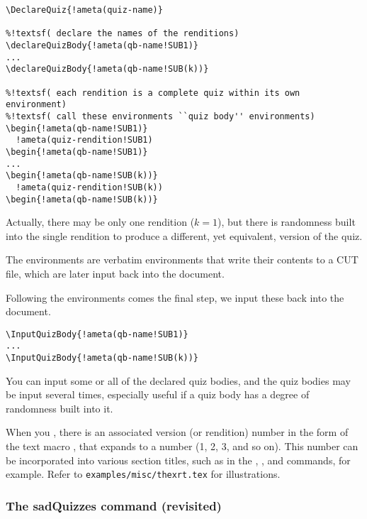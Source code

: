 \documentclass{article}
\let\tops\texorpdfstring
\def\FmtMP#1{\marginpar{\small\itshape\raggedleft#1}}
\edef\amtIndent{\the\parindent}
\begin{document}
\begin{Verbatim}[xleftmargin=\amtIndent,commandchars=!()]
%!textsf( declare the name of this quiz)
\DeclareQuiz{!ameta(quiz-name)}

%!textsf( declare the names of the renditions)
\declareQuizBody{!ameta(qb-name!SUB1)}
...
\declareQuizBody{!ameta(qb-name!SUB(k))}

%!textsf( each rendition is a complete quiz within its own environment)
%!textsf( call these environments ``quiz body'' environments)
\begin{!ameta(qb-name!SUB1)}
  !ameta(quiz-rendition!SUB1)
\begin{!ameta(qb-name!SUB1)}
...
\begin{!ameta(qb-name!SUB(k))}
  !ameta(quiz-rendition!SUB(k))
\begin{!ameta(qb-name!SUB(k))}
\end{Verbatim}
Actually, there may be only one rendition ($k=1$), but there is randomness built into
the single rendition to produce a different, yet equivalent, version of the quiz.

The  environments are verbatim environments that write their contents
to a CUT file, which are later input back into the document.

\newtopic\noindent Following the  environments comes the final step,
we input these back into the document.
\begin{Verbatim}[xleftmargin=\amtIndent,commandchars=!()]
\InputQuizBody{!ameta(qb-name!SUB1)}
...
\InputQuizBody{!ameta(qb-name!SUB(k))}
\end{Verbatim}
You can input some or all of the declared quiz bodies, and the quiz bodies may be input several
times, especially useful if a quiz body has a degree of randomness built into it.

When you , there is an associated version (or rendition)
number in the form of the text macro \FmtMP{\cs{QzVer}}, that
expands to a number (1, 2, 3, and so on). This number can be incorporated
into various section titles, such as in the ,
, and  commands, for example. Refer to
\texttt{examples/misc/thexrt.tex} for illustrations.

\subsubsection{The \tops{\protect\cs}{\textbackslash}{sadQuizzes} command (revisited)}
\end{document}
